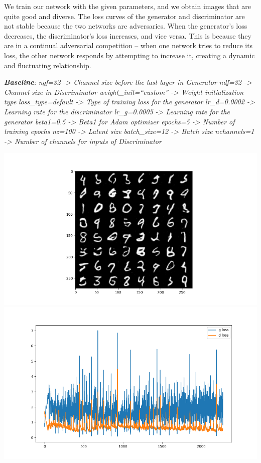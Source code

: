 We train our network with the given parameters, and we obtain images
that are quite good and diverse. The loss curves of the generator and
discriminator are not stable because the two networks are adversaries.
When the generator's loss decreases, the discriminator's loss increases,
and vice versa. This is because they are in a continual adversarial
competition -- when one network tries to reduce its loss, the other
network responds by attempting to increase it, creating a dynamic and
fluctuating relationship.

\emph{\textbf{Baseline}:} \emph{ngf=32 -\textgreater{} Channel size
before the last layer in Generator} \emph{ndf=32 -\textgreater{} Channel
size in Discriminator} \emph{weight\_init=``custom'' -\textgreater{}
Weight initialization type} \emph{loss\_type=default -\textgreater{}
Type of training loss for the generator} \emph{lr\_d=0.0002
-\textgreater{} Learning rate for the discriminator} \emph{lr\_g=0.0005
-\textgreater{} Learning rate for the generator} \emph{beta1=0.5
-\textgreater{} Beta1 for Adam optimizer} \emph{epochs=5 -\textgreater{}
Number of training epochs} \emph{nz=100 -\textgreater{} Latent size}
\emph{batch\_size=12 -\textgreater{} Batch size} \emph{nchannels=1
-\textgreater{} Number of channels for inputs of Discriminator}

\includegraphics{./images/Pasted image 20231228111114.png}\includegraphics{./images/Pasted image 20231228112219.png}

